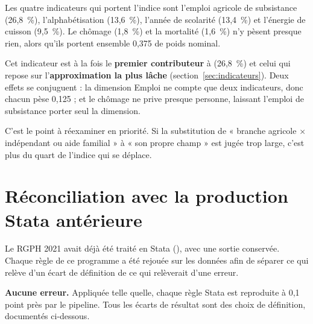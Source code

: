 \documentclass[11pt,a4paper]{article}
\begin{document}
Les quatre indicateurs qui portent l'indice sont l'emploi agricole de subsistance (26,8~\%),
l'alphabétisation (13,6~\%), l'année de scolarité (13,4~\%) et l'énergie de cuisson (9,5~\%). Le
chômage (1,8~\%) et la mortalité (1,6~\%) n'y pèsent presque rien, alors qu'ils portent ensemble
0,375 de poids nominal.

\begin{attention}
Cet indicateur est à la fois le \textbf{premier contributeur} à \ipm{} (26,8~\%) et celui qui repose
sur l'\textbf{approximation la plus lâche} (section~\ref{sec:indicateurs}). Deux effets se
conjuguent : la dimension Emploi ne compte que deux indicateurs, donc chacun pèse 0,125 ; et le
chômage ne prive presque personne, laissant l'emploi de subsistance porter seul la dimension.

C'est le point à réexaminer en priorité. Si la substitution de « branche agricole $\times$
indépendant ou aide familial » à « son propre champ » est jugée trop large, c'est plus du quart de
l'indice qui se déplace.
\end{attention}

\section{Réconciliation avec la production Stata antérieure}
\label{sec:stata}

Le RGPH 2021 avait déjà été traité en Stata (), avec une
sortie conservée. Chaque règle de ce programme a été rejouée sur les données afin de séparer ce qui
relève d'un écart de définition de ce qui relèverait d'une erreur.

\begin{retenir}
\textbf{Aucune erreur.} Appliquée telle quelle, chaque règle Stata est reproduite à 0,1 point près
par le pipeline. Tous les écarts de résultat sont des choix de définition, documentés ci-dessous.
\end{retenir}
\end{document}

